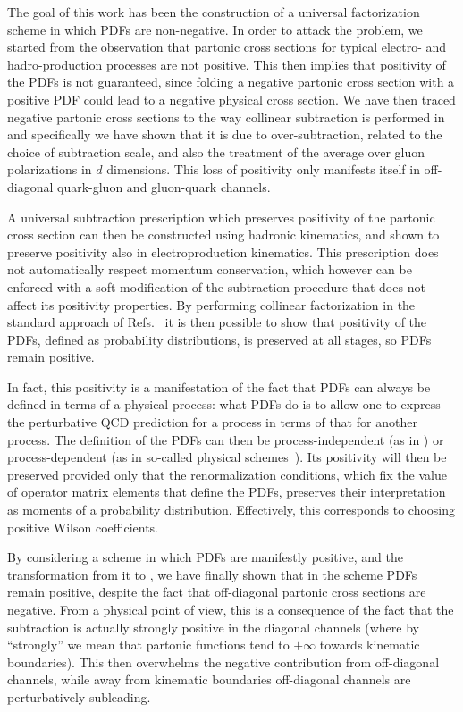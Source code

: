 
The goal of this work has been the construction of a universal factorization
scheme in which PDFs are non-negative.
In order to attack the problem, we started from the observation that \msbar{}
partonic cross sections for typical electro- and hadro-production processes are
not positive. This then implies that positivity of the PDFs is not guaranteed,
since folding a negative partonic cross section with a positive PDF could lead
to a negative physical cross section.
We have then traced negative partonic cross sections to the way collinear
subtraction is performed in \msbar{} and specifically we have shown that it is
due to over-subtraction, related to the choice of subtraction scale, and also
the treatment of the average over gluon polarizations in $d$ dimensions.
This loss of positivity only manifests itself  in off-diagonal quark-gluon and
gluon-quark channels.

A universal subtraction prescription  which preserves positivity of the partonic
cross section can then be constructed using hadronic kinematics, and
shown to preserve positivity also in electroproduction kinematics. This
prescription does not automatically respect momentum conservation,
which however can be enforced with a soft modification of the subtraction
procedure that does not affect its positivity properties. By
performing collinear factorization in the standard approach of
Refs.~\cite{Collins:1981uw,Curci:1980uw} it is then possible to show
that positivity of the PDFs, defined  as probability
distributions, is preserved at all stages, so PDFs remain positive.

In fact, this positivity is a manifestation of the fact that PDFs can
always be defined in terms of a physical process: what PDFs do is to
allow one to express the perturbative QCD prediction for a process in
terms of that for another process. The definition of the PDFs can then
be 
process-independent (as in \msbar{}) or process-dependent (as
in so-called physical schemes~\cite{Catani:1995ze,Diemoz:1987xu}).
Its positivity will then be preserved provided only that the renormalization
conditions, which fix the value of operator matrix elements that
define the PDFs, preserves their interpretation as moments of a
probability distribution. Effectively, this corresponds to choosing
positive Wilson coefficients.

By considering a scheme in which PDFs are manifestly positive, and the
transformation from it to \msbar{}, we have finally shown that in the
\msbar{} scheme PDFs remain positive, despite the fact that off-diagonal partonic
cross sections are negative. From a physical point of view, this is a consequence
of the fact that the \msbar{} subtraction is actually strongly positive
in the diagonal channels (where by ``strongly'' we mean that
partonic  functions tend to $+\infty$  towards kinematic
boundaries). This then overwhelms the negative contribution from
off-diagonal channels, while away from kinematic boundaries
off-diagonal channels are perturbatively subleading.

